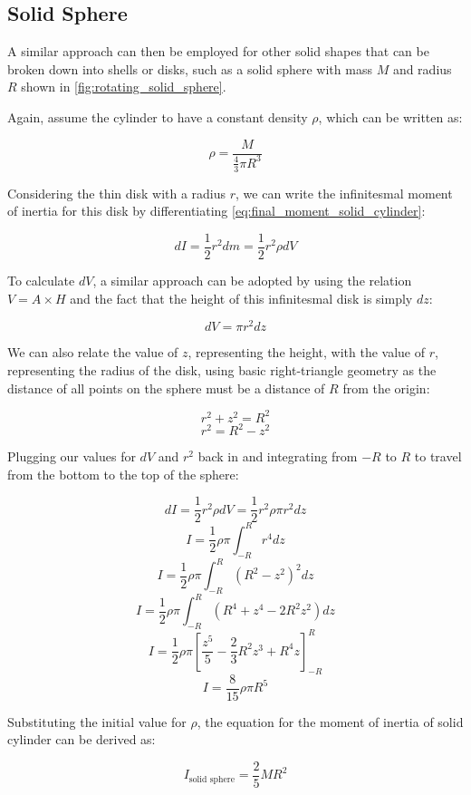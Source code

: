 \subsection{Solid Sphere}

A similar approach can then be employed for other solid shapes that can be broken down into shells or disks, such as a solid sphere with mass $M$ and radius $R$ shown in \cref{fig:rotating_solid_sphere}.



Again, assume the cylinder to have a constant density $\rho$, which can be written as:

\[\rho = \frac{M}{\frac{4}{3}\pi R^3}\]

Considering the thin disk with a radius $r$, we can write the infinitesmal moment of inertia for this disk by differentiating \cref{eq:final_moment_solid_cylinder}:

 \[dI = \frac{1}{2}r^2dm = \frac{1}{2}r^2\rho dV\]

 To calculate $dV$, a similar approach can be adopted by using the relation $V = A \times H$ and the fact that the height of this infinitesmal disk is simply $dz$:

 \[dV = \pi r^2 dz\]

 We can also relate the value of $z$, representing the height, with the value of $r$, representing the radius of the disk, using basic right-triangle geometry as the distance of all points on the sphere must be a distance of $R$ from the origin:

 \[r^2 + z^2 = R^2\]
 \[r^2 = R^2 - z^2\]

Plugging our values for $dV$ and $r^2$ back in and integrating from $-R$ to $R$ to travel from the bottom to the top of the sphere:

\[dI  = \frac{1}{2}r^2\rho dV = \frac{1}{2}r^2\rho \pi r^2 dz\]
\[I = \frac{1}{2}\rho \pi \int_{-R}^R r^4 dz\]
\[I = \frac{1}{2}\rho \pi \int_{-R}^R (R^2 - z^2)^2 dz\]
\[I =\frac{1}{2}\rho \pi \int_{-R}^R (R^4 + z^4 - 2R^2z^2) dz\]
\[I = \frac{1}{2}\rho \pi \left[\frac{z^5}{5} - \frac{2}{3}R^2z^3 + R^4z\right]_{-R}^{R}\]
\[I = \frac{8}{15}\rho \pi R^5\]

Substituting the initial value for $\rho$, the equation for the moment of inertia of solid cylinder can be derived as:

\begin{equation}
I_{\text{solid sphere}} = \frac{2}{5}MR^2
\label{eq:final_moment_solid_sphere}
\end{equation}